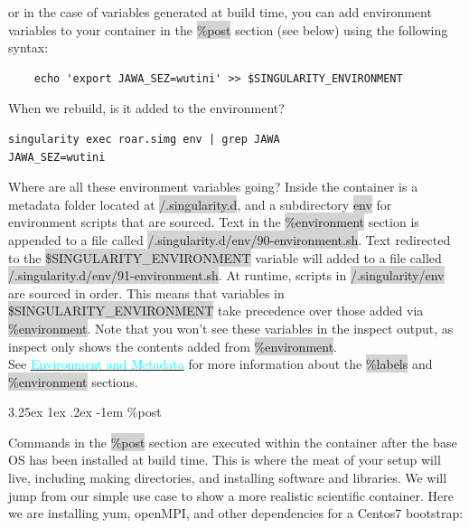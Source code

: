 \documentclass[a4paper]{article}
\makeatletter
\renewcommand\paragraph{\@startsection{paragraph}{5}{\z@}%
  {3.25ex \@plus1ex \@minus.2ex}%
  {-1em}%
  {\normalfont\normalsize\bfseries}}
\makeatother
\begin{document}
or in the case of variables generated at build time, you can add environment variables to your container in the \colorbox{lightgray}{\%post} section (see below) using the following syntax: 

\begin{lstlisting}[frame=single] 
%post
    echo 'export JAWA_SEZ=wutini' >> $SINGULARITY_ENVIRONMENT 
\end{lstlisting}

    When we rebuild, is it added to the environment?
    
\begin{lstlisting}[frame=single] 
singularity exec roar.simg env | grep JAWA
JAWA_SEZ=wutini
\end{lstlisting}

Where are all these environment variables going? Inside the container is a metadata folder located at \colorbox{lightgray}{/.singularity.d}, and a subdirectory \colorbox{lightgray}{env} for environment scripts that are sourced. Text in the \colorbox{lightgray}{\%environment} section is appended to a file called \colorbox{lightgray}{/.singularity.d/env/90-environment.sh}. Text redirected to the \colorbox{lightgray}{\$SINGULARITY\_ENVIRONMENT} variable will added to a file called \colorbox{lightgray}{/.singularity.d/env/91-environment.sh}. At runtime, scripts in \colorbox{lightgray}{/.singularity/env} are sourced in order. This means that variables in \colorbox{lightgray}{\$SINGULARITY\_ENVIRONMENT} take precedence over those added via \colorbox{lightgray}{\%environment}. Note that you won’t see these variables in the inspect output, as inspect only shows the contents added from \colorbox{lightgray}{\%environment}.\\[0.1in]

See \hyperref[sec:envandmetadata]{{\textcolor{cyan}{Environment and Metadata}}} for more information about the \colorbox{lightgray}{\%labels} and \colorbox{lightgray}{\%environment} sections.


		\paragraph{\%post}
		
		Commands in the \colorbox{lightgray}{\%post} section are executed within the container after the base OS has been installed at build time. This is where the meat of your setup will live, including making directories, and installing software and libraries. We will jump from our simple use case to show a more realistic scientific container. Here we are installing yum, openMPI, and other dependencies for a Centos7 bootstrap:
		
\end{document}
